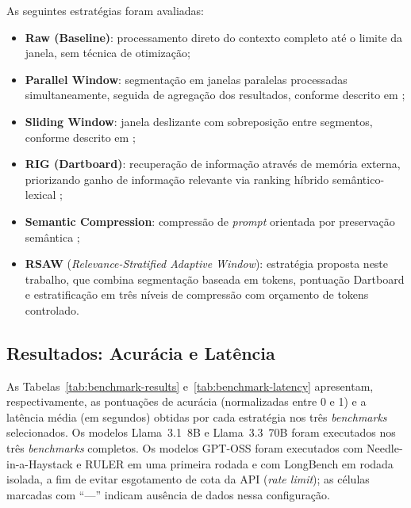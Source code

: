 As seguintes estratégias foram avaliadas:
\begin{itemize}
    \item \textbf{Raw (Baseline)}: processamento direto do contexto completo até o limite da janela, sem técnica de otimização;

    \item \textbf{Parallel Window}: segmentação em janelas paralelas processadas simultaneamente, seguida de agregação dos resultados, conforme descrito em \cite{ratner2023parallelcontextwindowslarge};

    \item \textbf{Sliding Window}: janela deslizante com sobreposição entre segmentos, conforme descrito em \cite{kamradt2023workaroundtokenlimit};

    \item \textbf{RIG (Dartboard)}: recuperação de informação através de memória externa, priorizando ganho de informação relevante via ranking híbrido semântico-lexical \cite{pickett2024betterragusingrelevantinformationgain};

    \item \textbf{Semantic Compression}: compressão de \textit{prompt} orientada por preservação semântica \cite{gilbert2023semanticcompressionlargelanguage};

    \item \textbf{RSAW} (\textit{Relevance-Stratified Adaptive Window}): estratégia proposta neste trabalho, que combina segmentação baseada em tokens, pontuação Dartboard e estratificação em três níveis de compressão com orçamento de tokens controlado.
\end{itemize}

\subsection{Resultados: Acurácia e Latência}

As Tabelas~\ref{tab:benchmark-results} e~\ref{tab:benchmark-latency} apresentam, respectivamente, as pontuações de acurácia (normalizadas entre 0 e 1) e a latência média (em segundos) obtidas por cada estratégia nos três \textit{benchmarks} selecionados. Os modelos Llama~3.1~8B e Llama~3.3~70B foram executados nos três \textit{benchmarks} completos. Os modelos GPT-OSS foram executados com Needle-in-a-Haystack e RULER em uma primeira rodada e com LongBench em rodada isolada, a fim de evitar esgotamento de cota da API (\textit{rate limit}); as células marcadas com ``---'' indicam ausência de dados nessa configuração.

